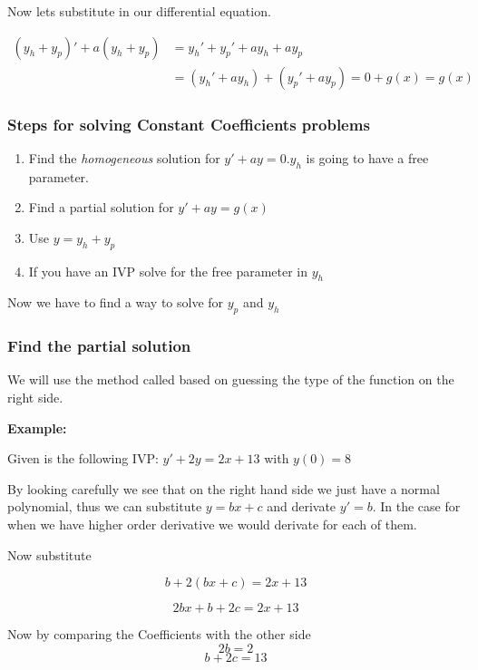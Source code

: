 Now lets substitute in our differential equation.

\begin{align*}
(y_h + y_p)' + a(y_h + y_p) &= y_h' + y_p' + ay_h + ay_p\\   
&= (y_h' + ay_h) + (y_p' + ay_p) = 0 + g(x) = g(x) 
\end{align*}

\subsubsection{Steps for solving Constant Coefficients problems}
\begin{enumerate}
    \item Find the \emph{homogeneous} solution for \(y' + ay = 0\).\(y_h\) is going
    to have a free parameter.
    \item Find a partial solution for \(y' + ay = g(x)\)
    \item Use \(y = y_h + y_p\)
    \item If you have an IVP solve for the free parameter in \(y_h\)
\end{enumerate}

Now we have to find a way to solve for \(y_p\) and \(y_h\)

\subsubsection{Find the partial solution}

We will use the method called based on guessing the type of the function on the right side.
\vspace{\baselineskip}

\textbf{Example: }
\vspace{\baselineskip}

Given is the following IVP: \(y' + 2y = 2x + 13\) with \(y(0) = 8\)
\vspace{\baselineskip}

By looking carefully we see that on the right hand side we just have a normal polynomial,
thus we can substitute \(y = bx + c\) and derivate \(y' = b\). In the case for when we have higher
order derivative we would derivate for each of them. 
\vspace{\baselineskip}

Now substitute

\[
b + 2(bx + c) = 2x + 13
\]

\[
2bx + b + 2c = 2x + 13
\]

Now by comparing the Coefficients with the other side 
\[2b = 2\]
\[b + 2c = 13\]

